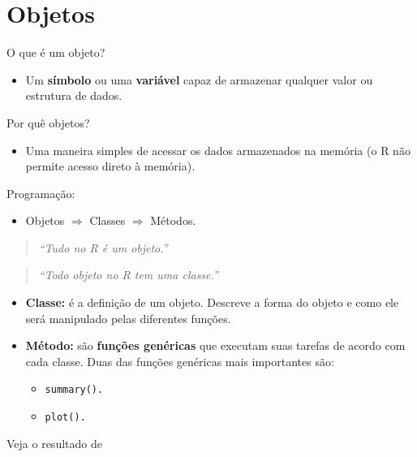 \documentclass[
  10pt,
  a4paper]{book}
\providecommand{\tightlist}{%
  \setlength{\itemsep}{0pt}\setlength{\parskip}{0pt}}
\begin{document}
\hypertarget{objetos}{%
\section{Objetos}\label{objetos}}

O que é um objeto?

\begin{itemize}
\tightlist
\item
  Um \textbf{símbolo} ou uma \textbf{variável} capaz de armazenar qualquer valor
  ou estrutura de dados.
\end{itemize}

Por quê objetos?

\begin{itemize}
\tightlist
\item
  Uma maneira simples de acessar os dados armazenados na memória (o R
  não permite acesso direto à memória).
\end{itemize}

Programação:

\begin{itemize}
\tightlist
\item
  Objetos \(\Rightarrow\) Classes \(\Rightarrow\) Métodos.
\end{itemize}

\begin{quote}
\emph{``Tudo no R é um objeto.''}
\end{quote}

\begin{quote}
\emph{``Todo objeto no R tem uma classe.''}
\end{quote}

\begin{itemize}
\tightlist
\item
  \textbf{Classe:} é a definição de um objeto. Descreve a forma do objeto e
  como ele será manipulado pelas diferentes funções.
\item
  \textbf{Método:} são \textbf{funções genéricas} que executam suas tarefas de
  acordo com cada classe. Duas das funções genéricas mais importantes
  são:

  \begin{itemize}
  \tightlist
  \item
    \texttt{summary().}
  \item
    \texttt{plot().}
  \end{itemize}
\end{itemize}

Veja o resultado de
\end{document}
